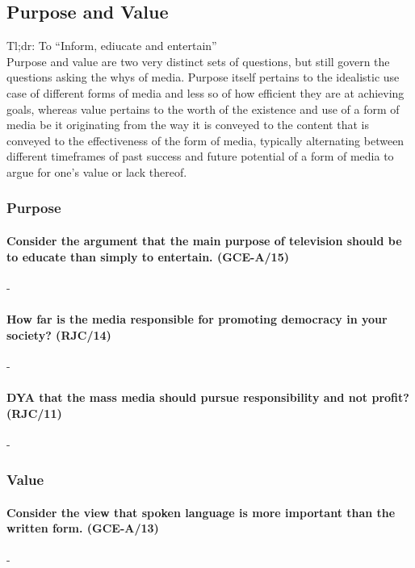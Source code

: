 \documentclass[../../main]{subfiles}
\begin{document}
\subsection{Purpose and Value}

Tl;dr: To ``Inform, ediucate and entertain'' \\

Purpose and value are two very distinct sets of questions, but still govern the questions asking the whys of media. Purpose itself pertains to the idealistic use case of different forms of media and less so of how efficient they are at achieving goals, whereas value pertains to the worth of the existence and use of a form of media be it originating from the way it is conveyed to the content that is conveyed to the effectiveness of the form of media, typically alternating between different timeframes of past success and future potential of a form of media to argue for one's value or lack thereof. 

\subsubsection{Purpose}

\paragraph{Consider the argument that the main purpose of television should be to educate than simply to entertain. (GCE-A/15)}-

\paragraph{How far is the media responsible for promoting democracy in your society? (RJC/14)}-

\paragraph{DYA that the mass media should pursue responsibility and not profit? (RJC/11)}-

\subsubsection{Value}

\paragraph{Consider the view that spoken language is more important than the written form. (GCE-A/13)         }-
\end{document}
